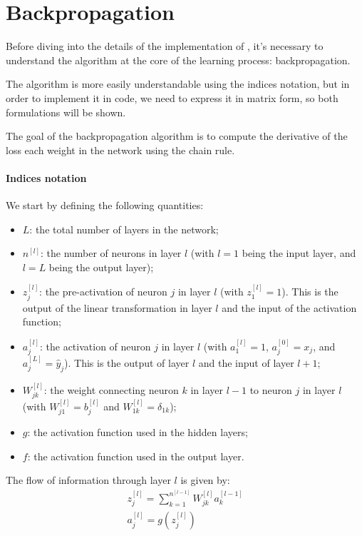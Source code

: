 \section{Backpropagation} \label{sec:backprop}
Before diving into the details of the implementation of \mfnet, it's necessary to understand the algorithm at the core of the learning process: backpropagation.

The algorithm is more easily understandable using the indices notation, but in order to implement it in code, we need to express it in matrix form, so both formulations will be shown.

The goal of the backpropagation algorithm is to compute the derivative of the loss \wrt each weight in the network using the chain rule.

\paragraph{Indices notation} \label{par:indices_notation}
We start by defining the following quantities:
\begin{itemize}
    \item $L$: the total number of layers in the network;
    \item $n^{[l]}$: the number of neurons in layer $l$ (with $l = 1$ being the input layer, and $l = L$ being the output layer);
    \item $z_j^{[l]}$: the pre-activation of neuron $j$ in layer $l$ (with $z_1^{[l]} = 1$). This is the output of the linear transformation in layer $l$ and the input of the activation function;
    \item $a_j^{[l]}$: the activation of neuron $j$ in layer $l$ (with $a_1^{[l]} = 1$, $a_j^{[0]} = x_j$, and $a_j^{[L]} = \hat{y}_j$). This is the output of layer $l$ and the input of layer $l+1$;
    \item $W_{jk}^{[l]}$: the weight connecting neuron $k$ in layer $l-1$ to neuron $j$ in layer $l$ (with $W_{j1}^{[l]} = b_j^{[l]}$ and $W_{1k}^{[l]} = \delta_{1k}$);
    \item $g$: the activation function used in the hidden layers;
    \item $f$: the activation function used in the output layer.
\end{itemize}

The flow of information through layer $l$ is given by:
\begin{gather*}
    z_j^{[l]} = \sum_{k=1}^{n^{[l-1]}} W_{jk}^{[l]} a_k^{[l-1]} \\
    a_j^{[l]} = g\left(z_j^{[l]}\right)
\end{gather*}

